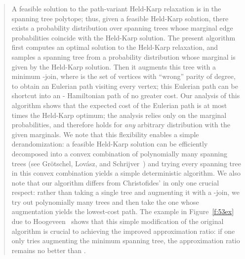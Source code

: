 \documentclass[11pt,letterpaper]{article}
\newcommand{\st}{\mbox{-} }
\begin{document}
\begin{quote}
A feasible solution to the path-variant Held-Karp relaxation is in the spanning tree polytope; thus, given a feasible Held-Karp solution, there exists a probability distribution over spanning trees whose marginal edge probabilities coincide with the Held-Karp solution. The present algorithm first computes an optimal solution to the Held-Karp relaxation, and samples a spanning tree from a probability distribution whose marginal is given by the Held-Karp solution. Then it augments this tree with a minimum -join, where  is the set of vertices with ``wrong'' parity of degree, to obtain an Eulerian path visiting every vertex; this Eulerian path can be shortcut into an \st Hamiltonian path of no greater cost. Our analysis of this algorithm shows that the expected cost of the Eulerian path is at most  times the Held-Karp optimum; the analysis relies only on the marginal probabilities, and therefore holds for \emph{any} arbitrary distribution with the given marginals. We note that this flexibility enables a simple derandomization: a feasible Held-Karp solution can be efficiently decomposed into a convex combination of polynomially many spanning trees (see Gr{\"o}tschel, Lov{\'a}sz, and Schrijver~\cite{GLS}) and trying every spanning tree in this convex combination yields a simple deterministic algorithm. We also note that our algorithm differs from Christofides' in only one crucial respect: rather than taking a single tree and augmenting it with a -join, we try out polynomially many trees and then take the one whose augmentation yields the lowest-cost path. The example in Figure~\ref{f:53ex} due to Hoogeveen~\cite{H} shows that this simple modification of the original algorithm is crucial to achieving the improved approximation ratio: if one only tries augmenting the minimum spanning tree, the approximation ratio remains no better than .


\end{quote}
\end{document}
